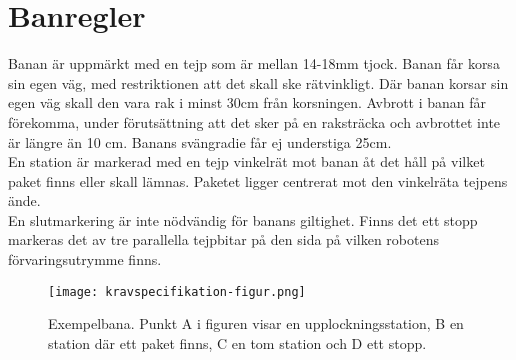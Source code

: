 \section{Banregler} \label{banregler}

Banan är uppmärkt med en tejp som är mellan 14-18mm tjock. Banan får korsa sin egen väg, med restriktionen att det skall ske rätvinkligt. Där banan korsar sin egen väg skall den vara rak i minst 30cm från korsningen. Avbrott i banan får förekomma, under förutsättning att det sker på en raksträcka och avbrottet inte är längre än 10 cm. Banans svängradie får ej understiga 25cm. \\
En station är markerad med en tejp vinkelrät mot banan åt det håll på vilket paket finns eller skall lämnas. Paketet ligger centrerat mot den vinkelräta tejpens ände. \\
En slutmarkering är inte nödvändig för banans giltighet. Finns det ett stopp markeras det av tre parallella tejpbitar på den sida på vilken robotens förvaringsutrymme finns. \\

\begin{figure}[h]
\center
\texttt{[image: kravspecifikation-figur.png]}
\endcenter
\caption{Exempelbana. Punkt A i figuren visar en upplockningsstation, B en station där ett paket finns, C en tom station och D ett stopp.}
\end{figure}